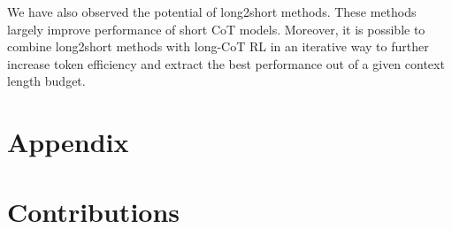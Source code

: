 \documentclass{article}
\begin{document}
We have also observed the potential of long2short methods. These methods largely improve performance of short CoT models. Moreover, it is possible to combine long2short methods with long-CoT RL in an iterative way to further increase token efficiency and extract the best performance out of a given context length budget. 

\printbibliography[title={References}]

\newpage
\appendix

\section*{Appendix}

\section{Contributions}
\end{document}
